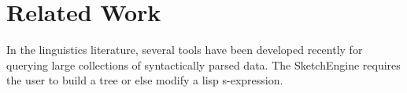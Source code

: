 
\section{Related Work}

In the linguistics literature, several tools have been developed recently for querying large collections of syntactically parsed data.  The SketchEngine \cite{} requires the user to build a tree or else modify a lisp s-expression.  